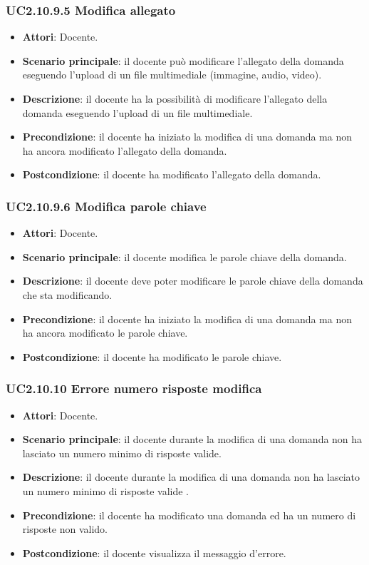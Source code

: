 \subsubsection{UC2.10.9.5 Modifica allegato}
\begin{itemize}
\item \textbf{Attori}: Docente.
\item \textbf{Scenario principale}: il docente può modificare l'allegato della domanda eseguendo l'upload di un file multimediale (immagine, audio, video).
\item \textbf{Descrizione}: il docente ha la possibilità di modificare l'allegato della domanda eseguendo l'upload di un file multimediale.
\item \textbf{Precondizione}: il docente ha iniziato la modifica di una domanda ma non ha ancora modificato l'allegato della domanda.
\item \textbf{Postcondizione}: il docente ha modificato l'allegato della domanda.
\end{itemize}
\subsubsection{UC2.10.9.6 Modifica parole chiave}
\begin{itemize}
\item \textbf{Attori}: Docente.
\item \textbf{Scenario principale}: il docente modifica le parole chiave della domanda.
\item \textbf{Descrizione}: il docente deve poter modificare le parole chiave della domanda che sta modificando.
\item \textbf{Precondizione}: il docente ha iniziato la modifica di una domanda ma non ha ancora modificato le parole chiave.
\item \textbf{Postcondizione}: il docente ha modificato le parole chiave.
\end{itemize}
\subsubsection{UC2.10.10 Errore numero risposte modifica}
\begin{itemize}
\item \textbf{Attori}: Docente.
\item \textbf{Scenario principale}: il docente durante la modifica di una domanda non ha lasciato un numero minimo di risposte valide.
\item \textbf{Descrizione}: il docente durante la modifica di una domanda non ha lasciato un numero minimo di risposte valide
.
\item \textbf{Precondizione}: il docente ha modificato una domanda ed ha un numero di risposte non valido.
\item \textbf{Postcondizione}: il docente visualizza il messaggio d'errore.
\end{itemize}
